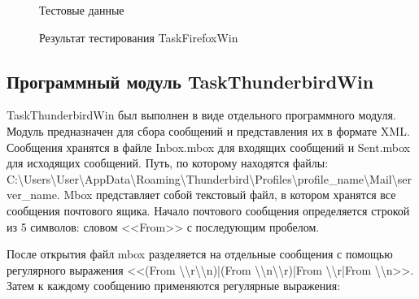 \begin{figure}[h!]
\caption{ Тестовые данные }
\label{teresh_4:teresh_4}
\end{figure}

\begin{figure}[h!]
\caption{ Результат тестирования TaskFirefoxWin }
\label{teresh_5:teresh_5}
\end{figure}

\clearpage
\subsection{ Программный модуль TaskThunderbirdWin }

TaskThunderbirdWin был выполнен в виде отдельного программного модуля. Модуль предназначен для сбора сообщений и представления их в формате XML. Сообщения хранятся в файле Inbox.mbox для входящих сообщений и Sent.mbox для исходящих сообщений. Путь, по которому находятся файлы: C:\textbackslash Users\textbackslash User\textbackslash AppData\textbackslash Roaming\textbackslash Thunderbird\textbackslash Profiles\textbackslash profile\_name\textbackslash Mail\textbackslash server\_name. Mbox представляет собой текстовый файл, в котором хранятся все сообщения почтового ящика. Начало почтового сообщения определяется строкой из 5 символов: словом <<From>> с последующим пробелом.

После открытия файл mbox разделяется на отдельные сообщения с помощью регулярного выражения <<(From \textbackslash \textbackslash r\textbackslash \textbackslash n)|(From \textbackslash \textbackslash n\textbackslash \textbackslash r)|From \textbackslash \textbackslash r|From \textbackslash \textbackslash n>>. Затем к каждому сообщению применяются регулярные выражения:

